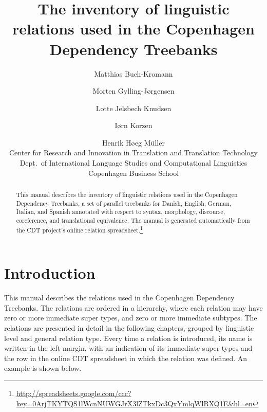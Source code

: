 \documentclass[11pt]{report}
\begin{document}
	\title{\sffamily\bfseries The inventory of linguistic relations used in the 
		Copenhagen Dependency Treebanks}
	\author{Matthias Buch-Kromann \and 
		Morten Gylling-Jørgensen \and
		Lotte Jelsbech Knudsen \and
		Iørn Korzen \and
		Henrik Høeg Müller \\[10pt]
		Center for Research and Innovation in Translation and Translation Technology \\
		Dept.\ of International Language Studies and Computational
		Linguistics \\
		Copenhagen Business School}
	\maketitle

	\begin{abstract}
		This manual describes the inventory of linguistic relations used in the
		Copenhagen Dependency Treebanks, a set of parallel treebanks
		for Danish, English, German, Italian, and Spanish annotated
		with respect to syntax, morphology, discourse, coreference,
		and translational equivalence. The manual is generated
		automatically from the CDT project's online relation
		spreadsheet.\footnote{\url{http://spreadsheets.google.com/ccc?key=0ArjTKYTQS1lWcnNUWGJrX3lZTkxDc3QxYmlqWlRXQ1E&hl=en}}
	\end{abstract}

	\tableofcontents

	\newpage

	\chapter{Introduction}

	This manual describes the relations used in the Copenhagen
	Dependency Treebanks. The relations are ordered in a hierarchy,
	where each relation may have zero or more immediate super types,
	and zero or more immediate subtypes. The relations are presented
	in detail in the following chapters, grouped by linguistic level
	and general relation type. Every time a relation is introduced,
	its name is written in the left margin, with an indication of its
	immediate super types and the row in the online CDT spreadsheet
	in which the relation was defined. An example is shown
	below.\medskip
\end{document}
